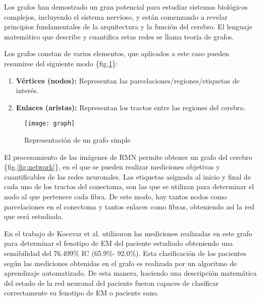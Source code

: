\documentclass[fleqn,12pt]{UICArticle} %
\begin{document}
Los grafos han demostrado un gran potencial para estudiar sistemas biológicos complejos, incluyendo el sistema nervioso, y están comenzando a revelar principios fundamentales de la arquitectura y la función del cerebro. El lenguaje matemático que describe y cuantifica estas redes se llama teoría de grafos.
 
Los grafos constan de varios elementos, que aplicados a este caso pueden resumirse del siguiente modo  \{fig.\ref{fig:graph}\}:
\begin{enumerate}[noitemsep]
\item \textbf{Vértices (nodos):} Representan las parcelaciones/regiones/etiquetas de interés.
\item \textbf{Enlaces (aristas):} Representan los tractos entre las regiones del cerebro.
\end{enumerate}

\begin{figure}[ht]
	\centering
	\texttt{[image: graph]}
	\vspace{5mm} 
	\caption{Representación de un grafo simple}
	\label{fig:graph}
\end{figure}

El procesamiento de las imágenes de RMN permite obtener un grafo del cerebro \{fig.\ref{fig:network}\}, en el que se pueden realizar mediciones objetivas y cuantificables de las redes neuronales. Las etiquetas asignada al inicio y final de cada uno de los tractos del conectoma, son las que se utilizan para determinar el nodo al que pertenece cada fibra. De este modo, hay tantos nodos como parcelaciones en el conectoma y tantos enlaces como fibras, obteniendo así la red que será estudiada.

En el trabajo de Kocevar et al.\cite{Kocevar2016} utilizaron las mediciones realizadas en este grafo para determinar el fenotipo de EM del paciente estudiado obteniendo una sensibilidad del 76.499\% IC (65.9\%- 92.0\%). Esta clasificación de los pacientes según las mediciones obtenidas en el grafo es realizada por un algoritmo de aprendizaje automatizado. De esta manera, haciendo una descripción matemática del estado de la red neuronal del paciente fueron capaces de clasificar correctamente su fenotipo de EM o paciente sano.


\begin{figure*}[b]
	\centering
	\vspace{5mm} 
	\caption{Grafo basado en las particiones de Destrieux et al.\cite{Destrieux2010}}
	\label{fig:network}
\end{figure*}
\end{document}
